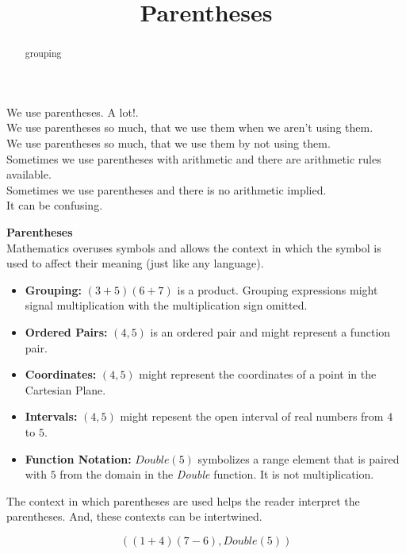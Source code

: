 \documentclass{ximera}
\title{Parentheses}
\begin{document}
\begin{abstract}
grouping
\end{abstract}
\maketitle



We use parentheses. A lot!. \\

We use parentheses so much, that we use them when we aren't using them. \\

We use parentheses so much, that we use them by not using them. \\

Sometimes we use parentheses with arithmetic and there are arithmetic rules available. \\

Sometimes we use parentheses and there is no arithmetic implied. \\


It can be confusing. \\ 









\begin{notation}  \textbf{\textcolor{blue!55!black}{Parentheses}}  \\

Mathematics overuses symbols and allows the context in which the symbol is used to affect their meaning (just like any language).
  \begin{itemize}
    \item \textbf{Grouping:} $(3+5)(6+7)$ is a product.  Grouping expressions might signal multiplication with the multiplication sign omitted.
    \item \textbf{Ordered Pairs:} $(4, 5)$ is an ordered pair and might represent a function pair.
    \item \textbf{Coordinates:} $(4, 5)$ might represent the coordinates of a point in the Cartesian Plane.
    \item \textbf{Intervals:} $(4, 5)$ might repesent the open interval of real numbers from $4$ to $5$.
    \item \textbf{Function Notation:} $Double(5)$ symbolizes a range element that is paired with $5$ from the domain in the \textit{Double} function. It is not multiplication.
  \end{itemize}


The context in which parentheses are used helps the reader interpret the parentheses.  And, these contexts can be intertwined.

\[  ((1+4)(7-6), Double(5))    \]
\end{notation}
\end{document}

